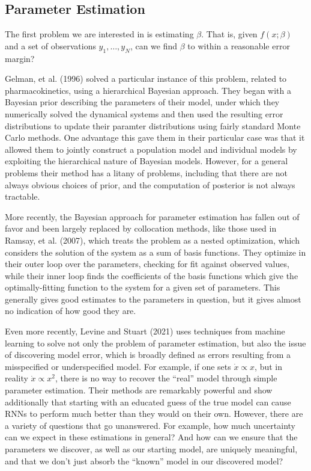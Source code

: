 \documentclass[12pt]{article}
\begin{document}
\subsection{Parameter Estimation}

The first problem we are interested in is estimating $\beta$. That is, given $f(x;\beta)$ and a set of observations $y_1, \ldots, y_N$, can we find $\beta$ to within a reasonable error margin?

Gelman, et al. (1996) solved a particular instance of this problem, related to pharmacokinetics, using a hierarchical Bayesian approach. They began with a Bayesian prior describing the parameters of their model, under which they numerically solved the dynamical systems and then used the resulting error distributions to update their paramter distributions using fairly standard Monte Carlo methods. One advantage this gave them in their particular case was that it allowed them to jointly construct a population model and individual models by exploiting the hierarchical nature of Bayesian models.\cite{gelman} However, for a general problems their method has a litany of problems, including that there are not always obvious choices of prior, and the computation of posterior is not always tractable.

More recently, the Bayesian approach for parameter estimation has fallen out of favor and been largely replaced by collocation methods, like those used in Ramsay, et al. (2007), which treats the problem as a nested optimization, which considers the solution of the system as a sum of basis functions. They optimize in their outer loop over the parameters, checking for fit against observed values, while their inner loop finds the coefficients of the basis functions which give the optimally-fitting function to the system for a given set of parameters.\cite{ramsay} This generally gives good estimates to the parameters in question, but it gives almost no indication of how good they are.

Even more recently, Levine and Stuart (2021) uses techniques from machine learning to solve not only the problem of parameter estimation, but also the issue of discovering model error, which is broadly defined as errors resulting from a misspecified or underspecified model. For example, if one sets $\dot{x} \propto x$, but in reality $\dot{x} \propto x^2$, there is no way to recover the ``real'' model through simple parameter estimation. Their methods are remarkably powerful and show additionally that starting with an educated guess of the true model can cause RNNs to perform much better than they would on their own. However, there are a variety of questions that go unanswered. For example, how much uncertainty can we expect in these estimations in general? And how can we ensure that the parameters we discover, as well as our starting model, are uniquely meaningful, and that we don't just absorb the ``known'' model in our discovered model?
\end{document}
